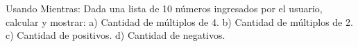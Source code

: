 ﻿
Usando Mientras: Dada una lista de 10 números ingresados por el usuario, calcular y mostrar: a) Cantidad de múltiplos de 4. b) Cantidad de múltiplos de 2. c) Cantidad de positivos. d) Cantidad de negativos.


\newpage
{}

\volverindice
\newpage
